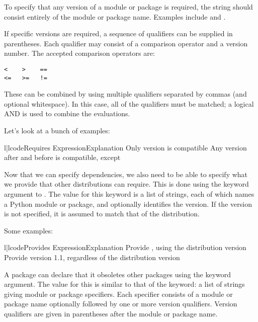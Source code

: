 \documentclass{manual}
\begin{document}
To specify that any version of a module or package is required, the
string should consist entirely of the module or package name.
Examples include  and .

If specific versions are required, a sequence of qualifiers can be
supplied in parentheses.  Each qualifier may consist of a comparison
operator and a version number.  The accepted comparison operators are:

\begin{verbatim}
<    >    ==
<=   >=   !=
\end{verbatim}

These can be combined by using multiple qualifiers separated by commas
(and optional whitespace).  In this case, all of the qualifiers must
be matched; a logical AND is used to combine the evaluations.

Let's look at a bunch of examples:

\begin{tableii}{l|l}{code}{Requires Expression}{Explanation}
                 {Only version  is compatible}
   {Any version after  and before
                                 is compatible, except
                                }
\end{tableii}

Now that we can specify dependencies, we also need to be able to
specify what we provide that other distributions can require.  This is
done using the  keyword argument to .
The value for this keyword is a list of strings, each of which names a
Python module or package, and optionally identifies the version.  If
the version is not specified, it is assumed to match that of the
distribution.

Some examples:

\begin{tableii}{l|l}{code}{Provides Expression}{Explanation}
        {Provide , using the distribution version}
   {Provide  version 1.1, regardless of the
                       distribution version}
\end{tableii}

A package can declare that it obsoletes other packages using the
 keyword argument.  The value for this is similar to
that of the  keyword: a list of strings giving module or
package specifiers.  Each specifier consists of a module or package
name optionally followed by one or more version qualifiers.  Version
qualifiers are given in parentheses after the module or package name.
\end{document}
